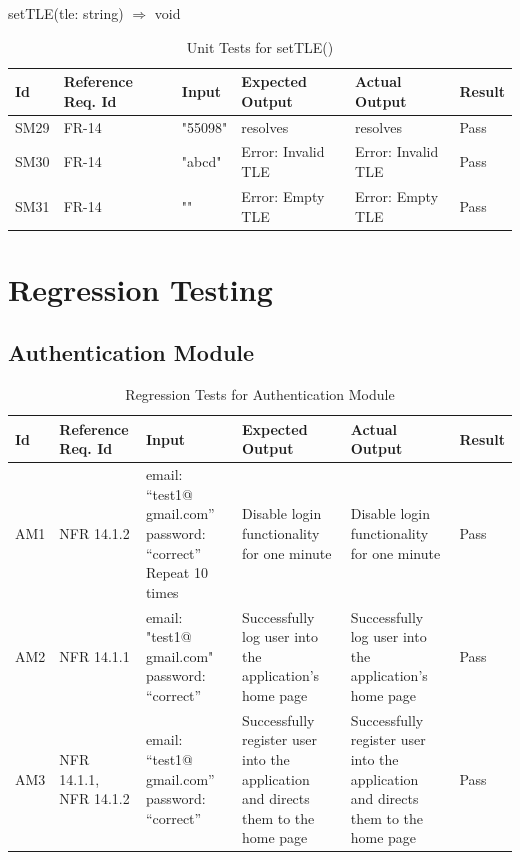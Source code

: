 \documentclass[12pt, titlepage]{article}
\begin{document}
setTLE(tle: string) $\Rightarrow$ void

\begin{center}
\begin{longtable}{|p{1cm} | p{2cm} |p{2cm}| p{2cm} |p{2cm}| p{2cm}|}
\caption{Unit Tests for setTLE()}
\hline
\textbf{Id} & \textbf{Reference Req. Id} & \textbf{Input} & \textbf{Expected Output} & \textbf{Actual Output} & \textbf{Result} \\
\hline
SM29 & FR-14 & { "55098" } & resolves
 & resolves & Pass
\\
\hline
SM30 & FR-14 & { "abcd" } & Error: Invalid TLE
 & Error: Invalid TLE & Pass
 \\
\hline
SM31 & FR-14 & { "" } & Error: Empty TLE
 & Error: Empty TLE & Pass
 \\
 \hline
\end{longtable}

\end{center}


\section{Regression Testing}

\subsection{Authentication Module}

\begin{center}
\begin{longtable}{|p{1cm} | p{2cm} |p{2cm}| p{2cm} |p{2cm}| p{2cm}|}
\caption{Regression Tests for Authentication Module}
\hline
\textbf{Id} & \textbf{Reference Req. Id} & \textbf{Input} & \textbf{Expected Output} & \textbf{Actual Output} & \textbf{Result} \\
\hline
AM1 & NFR 14.1.2 & {email: “test1@ gmail.com”
password: “correct” } Repeat 10 times
 & Disable login functionality for one minute
 & Disable login functionality for one minute & Pass
\\
\hline
AM2 & NFR 14.1.1 & { email: "test1@ gmail.com"
password: “correct” }
 & Successfully log user into the application’s home page
 & Successfully log user into the application’s home page & Pass
\\
\hline
AM3 & NFR 14.1.1, NFR 14.1.2 & { email: “test1@ gmail.com”
password: “correct” }
 & Successfully register user into the application and directs them to the home page
 & Successfully register user into the application and directs them to the home page & Pass
\\
\hline

\end{longtable}

\end{center}
\end{document}
